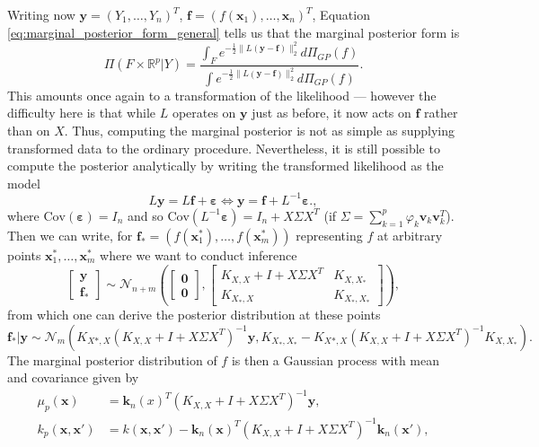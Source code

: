 \documentclass[11pt]{article}
\newcommand{\eps}{\varepsilon}
\newcommand{\R}{\mathbb{R}}
\newcommand{\cov}{\textrm{Cov}}
\newcommand{\bv}{\mathbf{v}}
\newcommand{\bx}{\mathbf{x}}
\begin{document}
Writing now $\mathbf{y} = (Y_1, \dots, Y_n)^T$, $\mathbf{f} = (f(\mathbf{x}_1), \dots, \mathbf{x}_n)^T$, Equation \eqref{eq:marginal_posterior_form_general} tells us that the marginal posterior form is
$$
\Pi(F \times \R^p | Y) = \frac{\int_F e^{-\frac{1}{2}\|L(\mathbf{y} - \mathbf{f})\|_2^2} d\Pi_{GP}(f)}{\int e^{-\frac{1}{2}\|L(\mathbf{y} - \mathbf{f})\|_2^2} d\Pi_{GP}(f)}.
$$
This amounts once again to a transformation of the likelihood --- however the difficulty here is that while $L$ operates on $\mathbf{y}$ just as before, it now acts on $\mathbf{f}$ rather than on $X$. Thus, computing the marginal posterior is not as simple as supplying transformed data to the ordinary procedure. Nevertheless, it is still possible to compute the posterior analytically by writing the transformed likelihood as the model 
$$
L\mathbf{y} = L\mathbf{f} + \boldsymbol{\eps} \Leftrightarrow \mathbf{y} = \mathbf{f} + L^{-1}\boldsymbol{\eps}.,
$$
where $\cov(\boldsymbol{\eps}) = I_n$ and so $\cov(L^{-1}\boldsymbol{\eps}) = 
I_n + X\Sigma X^T $ (if $\Sigma = \sum_{k=1}^p \varphi_k \bv_k \bv_k^T$). Then we can write, for $\mathbf{f}_* = (f(\bx_1^*), \dots, f(\bx_m^*))$ representing $f$ at arbitrary points $\bx_1^*, \dots, \bx_m^*$ where we want to conduct inference
$$
\left[\begin{matrix}
	\mathbf{y} \\ \mathbf{f_*}
\end{matrix} \right]
\sim \mathcal{N}_{n + m} \left( 
\left[\begin{matrix}
\mathbf{0} \\ \mathbf{0}	
\end{matrix} \right]
, 
\left[\begin{matrix}
K_{X, X} + I + X\Sigma X^T & K_{X, X_*} \\ 
K_{X_*, X} & K_{X_*, X_*}
\end{matrix} \right]
 \right),
$$
from which one can derive the posterior distribution at these points
$$
\mathbf{f_*} | \mathbf{y} \sim \mathcal{N}_m \left(
K_{X*, X}(K_{X, X} + I + X\Sigma X^T)^{-1} \mathbf{y}, K_{X_*, X_*} - K_{X*, X}(K_{X, X} + I + X\Sigma X^T)^{-1}K_{X, X_*}
\right).
$$
The marginal posterior distribution of $f$ is then a Gaussian process with mean and covariance given by
\begin{align}
	\mu_p(\bx) &= \mathbf{k}_n(x)^T (K_{X, X} + I + X\Sigma X^T)^{-1}\mathbf{y}, \label{eq:gp_posterior_linear} \\
	k_p(\bx, \bx') &= k(\bx, \bx') - \mathbf{k}_n(\bx)^T (K_{X, X} + I + X\Sigma X^T)^{-1} \mathbf{k}_n(\bx'), \nonumber
\end{align}
\end{document}
